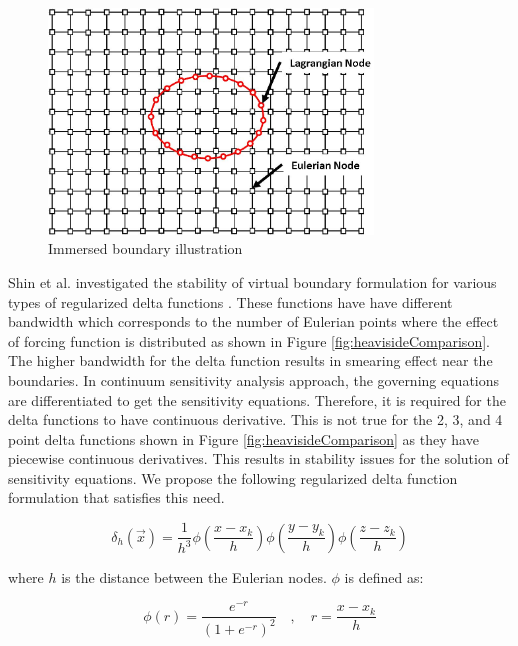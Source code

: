 \documentclass[12pt]{aiaa-pretty}
\begin{document}
%
\begin{figure}[H]
	\centering
	\includegraphics[height=6.0cm]{figure/immerdBoundary.jpg}
	\caption{Immersed boundary illustration}
	\label{fig:immersedBoundary}
\end{figure}
%

Shin et al. investigated the stability of virtual boundary formulation for various types of regularized delta functions \cite{shin2008assessment}. These functions have have different bandwidth which corresponds to the number of Eulerian points where the effect of forcing function is distributed as shown in Figure \ref{fig:heavisideComparison}. The higher bandwidth for the delta function results in smearing effect near the boundaries. In continuum sensitivity analysis approach, the governing equations are differentiated to get the sensitivity equations. Therefore, it is required for the delta functions to have continuous derivative. This is not true for the 2, 3, and 4 point delta functions shown in Figure \ref{fig:heavisideComparison} as they have piecewise continuous derivatives. This results in stability issues for the solution of sensitivity equations. We propose the following regularized delta function formulation that satisfies this need.

%
\begin{equation}\label{eq:heavisideFunction}
	\delta_h(\vec{x}) = \frac{1}{h^3} \phi \left( \frac{x - x_k}{h} \right)
									 \phi \left( \frac{y - y_k}{h} \right)
									 \phi \left( \frac{z - z_k}{h} \right)
\end{equation}
%

where $h$ is the distance between the Eulerian nodes. $\phi$ is defined as:

%
\begin{equation}\label{eq:continuousDeltaFunction}
	\phi(r) = \frac{e^{-r}}{\left( 1 + e^{-r} \right)^2} \quad , \quad r = \frac{x - x_k}{h}
\end{equation}
%
\end{document}
